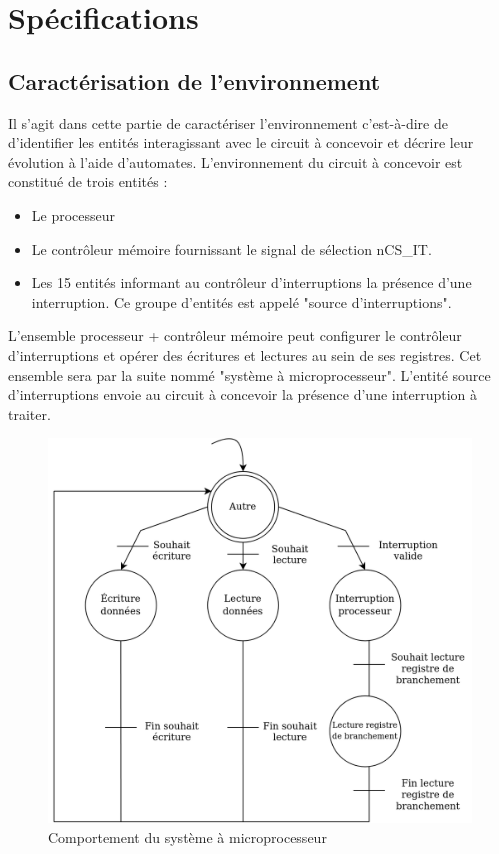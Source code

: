 \section{Spécifications}

\subsection{Caractérisation de l'environnement}

Il s'agit dans cette partie de caractériser l'environnement c'est-à-dire de d'identifier les entités interagissant avec le circuit à concevoir et décrire leur évolution à l'aide d'automates.
L'environnement du circuit à concevoir est constitué de trois entités :

\begin{itemize}
	\item Le processeur
	\item Le contrôleur mémoire fournissant le signal de sélection nCS\_IT.
	\item Les 15 entités informant au contrôleur d'interruptions la présence d'une interruption.
	      Ce groupe d'entités est appelé "source d'interruptions".
\end{itemize}

L'ensemble processeur + contrôleur mémoire peut configurer le contrôleur d'interruptions et opérer des écritures et lectures au sein de ses registres.
Cet ensemble sera par la suite nommé "système à microprocesseur".
L'entité source d'interruptions envoie au circuit à concevoir la présence d'une interruption à traiter.

\begin{figure}[H]
	\centering
	\includegraphics[width=0.8\linewidth]{figure/spec_automate_proc_ctrlmem.png}
	\caption{Comportement du système à microprocesseur}
	\label{fig:spec_automate_sysmicro}
\end{figure}

